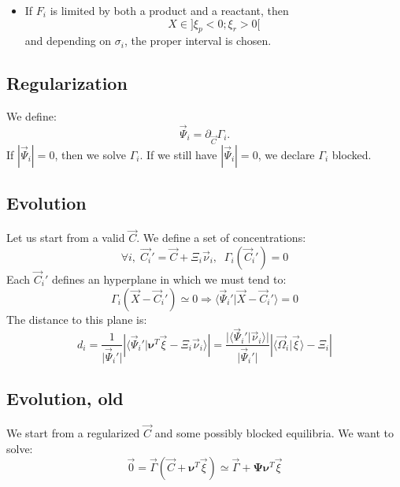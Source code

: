 \documentclass[aps,12pt]{revtex4}
\begin{document}
\begin{itemize}
\begin{itemize}
	\item If $F_i$ is limited by both a product and a reactant, then $$X\in\rbrack \xi_p < 0 ; \xi_r > 0 \lbrack$$
	and depending on $\sigma_i$, the proper interval is chosen.
	\end{itemize}
	
\end{itemize}



 \subsection{Regularization}
We define:
\begin{equation}
\vec{\Psi}_i = \partial_{\vec{C}} \Gamma_i.
\end{equation}
If $|\vec{\Psi}_i|=0$, then we solve $\Gamma_i$. If we still have $|\vec{\Psi}_i|=0$, we declare $\Gamma_i$ blocked.

\subsection{Evolution}
Let us start from a valid $\vec{C}$.
We define a set of concentrations:
\begin{equation}
	\forall i,\;\vec{C_i}' = \vec{C} + \Xi_i \vec{\nu}_i,\;\;\Gamma_i(\vec{C}_i') = 0
\end{equation}
Each $\vec{C}_i'$ defines an hyperplane in which we must tend to:
\begin{equation}
	\Gamma_i(\vec{X}-\vec{C}_i') \simeq 0 \Rightarrow \langle\vec{\Psi}_i'\vert \vec{X}-\vec{C}_i' \rangle = 0
\end{equation}
The distance to this plane is:
\begin{equation}
	d_i = \dfrac{1}{\vert \vec{\Psi}_i' \vert}
	\left\vert \langle \vec{\Psi}_i' \vert \bm{\nu}^T \vec{\xi} - \Xi_i \vec{\nu}_i \rangle \right\vert
	=   \dfrac{ \vert\langle \vec{\Psi}_i' \vert \vec{\nu}_i \rangle \vert }{  \vert \vec{\Psi}_i' \vert } 
	\left\vert \langle \vec{\Omega}_i \vert \vec{\xi}\rangle - \Xi_i \right\vert
\end{equation}

\subsection{Evolution, old}

We start from a regularized $\vec{C}$ and some possibly blocked equilibria. We 
want to solve:
\begin{equation}
	\vec{0} = 	\vec{\Gamma}(\vec{C}+\bm{\nu}^T \vec{\xi}) \simeq \vec{\Gamma} + \bm{\Psi} \bm{\nu}^T \vec{\xi}
\end{equation}
\end{document}
